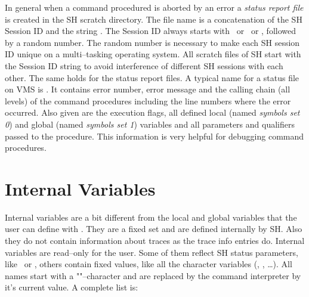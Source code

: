 In general when a command procedured is aborted by an error a
{\em status report file\/} is created in the SH scratch directory.
The file name is a concatenation of the SH Session ID and the
string .  The Session ID always starts with
\ or \ or , followed by a random number.
The random number is necessary to make each SH session ID unique on a
multi--tasking operating system.  All scratch files of SH start with
the Session ID string to avoid interference of different SH
sessions with each other.  The same holds for the status report files.
A typical name for a status file on VMS is .
It contains error number, error message and the calling chain
(all levels) of the command procedures including the line
numbers where the error occurred.  Also given are the execution
flags, all defined local (named {\em symbols set 0\/}) and global
(named {\em symbols set 1\/}) variables and all parameters and
qualifiers passed to the procedure.  This information is very
helpful for debugging command procedures.




\section{Internal Variables}
\label{sec:InternVar}

Internal variables are a bit different from the local and global
variables that the user can define with .  They are
a fixed set and are defined internally by SH.  Also they do not
contain information about traces as the trace info entries do.
Internal variables are read--only for the user.  Some of them
reflect SH status parameters, like \ or
, others contain fixed values, like all the character
variables (, , \ldots).  All names
start with a "\exm{\$}"--character and are replaced by the command
interpreter by it's current value.  A complete list is:

